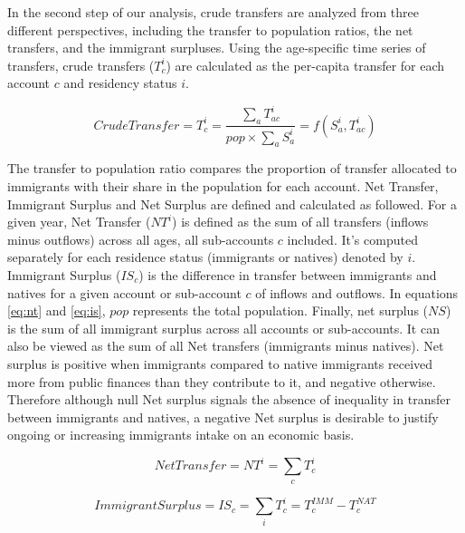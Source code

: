 \vspace{0.7em}\par
In the second step of our analysis, crude transfers are analyzed from three different perspectives, including the transfer to population ratios, the net transfers, and the immigrant surpluses.
Using the age-specific time series of transfers, crude transfers (\(T^{i}_c \)) are calculated as the per-capita transfer for each account \(c \) and residency status \(i\).

\begin{equation}\label{eq:pc}
  Crude Transfer=T^{i}_c= \frac{\displaystyle\sum_{a}T^{i}_{ac} }{ pop \times \displaystyle\sum_{a} S^{i}_a}=f(S^{i}_a, T^{i}_{ac})
\end{equation}

The transfer to population ratio compares the proportion of transfer allocated to immigrants with their share in the population for each account.
Net Transfer, Immigrant Surplus and Net Surplus are defined and calculated as followed.
For a given year, Net Transfer (\(NT^{i}\)) is defined as the sum of all transfers (inflows minus outflows) across all ages, all sub-accounts \(c \) included.
It's computed separately for each residence status (immigrants or natives) denoted by \(i \).
Immigrant Surplus (\(IS_{c}\)) is the difference in transfer between immigrants and natives for a given account or sub-account \(c \) of inflows and outflows.
In equations \eqref{eq:nt} and \eqref{eq:is}, \( pop \) represents the total population.
Finally, net surplus (\( NS \)) is the sum of all immigrant surplus across all accounts or sub-accounts.
It can also be viewed as the sum of all Net transfers (immigrants minus natives).
Net surplus is positive when immigrants compared to native immigrants received more from public finances than they contribute to it, and negative otherwise.
Therefore although null Net surplus signals the absence of inequality in transfer between immigrants and natives, a negative Net surplus is desirable to justify ongoing or increasing immigrants intake on an economic basis.

\begin{equation}\label{eq:nt}
  Net Transfer=NT^{i}= \displaystyle\sum_{c}T^{i}_{c}
\end{equation}

\begin{equation}\label{eq:is}
  Immigrant Surplus=IS_{c}= \displaystyle\sum_{i}T^{i}_{c}=T^{IMM}_{c}-T^{NAT}_{c}
\end{equation}

